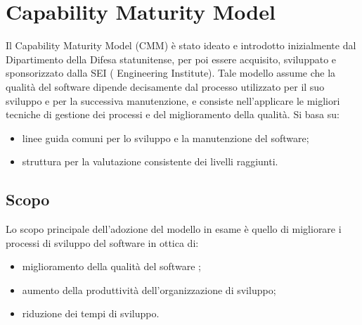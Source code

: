 \documentclass[PdQ.tex]{subfiles}
\begin{document}
\hypertarget{CMM}{\section{Capability Maturity Model}}
	Il Capability Maturity Model (CMM) è stato ideato e introdotto inizialmente dal Dipartimento della Difesa statunitense, per poi essere acquisito, sviluppato e sponsorizzato dalla SEI ( Engineering Institute). Tale modello
assume che la qualità del software dipende decisamente dal processo utilizzato per il suo sviluppo e per la successiva manutenzione, e consiste nell'applicare le migliori tecniche di gestione dei processi e del miglioramento della qualità. Si basa su:
	\begin{itemize}
		\item linee guida comuni per lo sviluppo e la manutenzione del software;
		\item struttura per la valutazione consistente dei livelli raggiunti.
	\end{itemize}
	
	\subsection{Scopo}
	Lo scopo principale dell'adozione del modello in esame è quello di migliorare i processi di sviluppo del software in ottica di:
	\begin{itemize}
		\item miglioramento della qualità del software ;
		\item aumento della produttività dell'organizzazione di sviluppo;
		\item riduzione dei tempi di sviluppo.
	\end{itemize}
\end{document}
